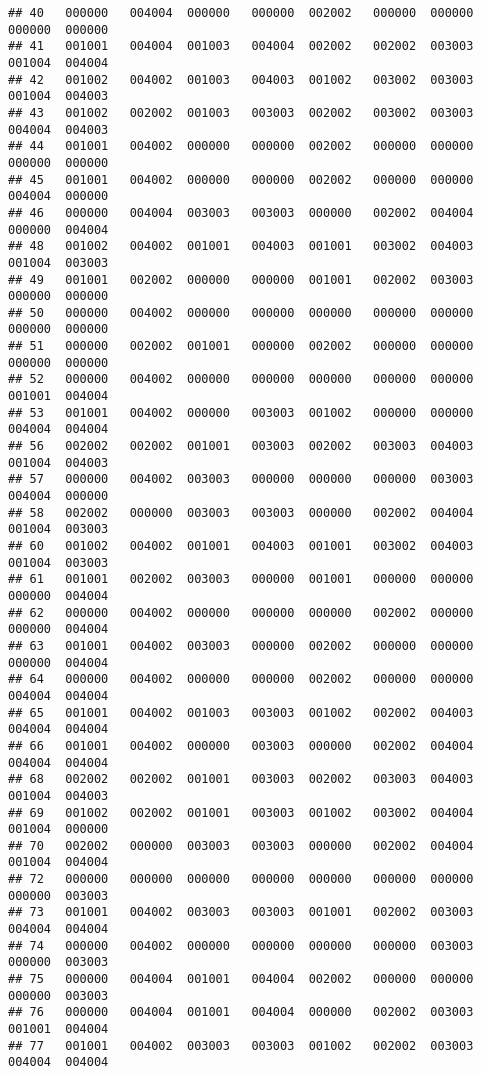 \documentclass[
]{article}
\begin{document}
\begin{verbatim}
## 40   000000   004004  000000   000000  002002   000000  000000   000000  000000
## 41   001001   004004  001003   004004  002002   002002  003003   001004  004004
## 42   001002   004002  001003   004003  001002   003002  003003   001004  004003
## 43   001002   002002  001003   003003  002002   003002  003003   004004  004003
## 44   001001   004002  000000   000000  002002   000000  000000   000000  000000
## 45   001001   004002  000000   000000  002002   000000  000000   004004  000000
## 46   000000   004004  003003   003003  000000   002002  004004   000000  004004
## 48   001002   004002  001001   004003  001001   003002  004003   001004  003003
## 49   001001   002002  000000   000000  001001   002002  003003   000000  000000
## 50   000000   004002  000000   000000  000000   000000  000000   000000  000000
## 51   000000   002002  001001   000000  002002   000000  000000   000000  000000
## 52   000000   004002  000000   000000  000000   000000  000000   001001  004004
## 53   001001   004002  000000   003003  001002   000000  000000   004004  004004
## 56   002002   002002  001001   003003  002002   003003  004003   001004  004003
## 57   000000   004002  003003   000000  000000   000000  003003   004004  000000
## 58   002002   000000  003003   003003  000000   002002  004004   001004  003003
## 60   001002   004002  001001   004003  001001   003002  004003   001004  003003
## 61   001001   002002  003003   000000  001001   000000  000000   000000  004004
## 62   000000   004002  000000   000000  000000   002002  000000   000000  004004
## 63   001001   004002  003003   000000  002002   000000  000000   000000  004004
## 64   000000   004002  000000   000000  002002   000000  000000   004004  004004
## 65   001001   004002  001003   003003  001002   002002  004003   004004  004004
## 66   001001   004002  000000   003003  000000   002002  004004   004004  004004
## 68   002002   002002  001001   003003  002002   003003  004003   001004  004003
## 69   001002   002002  001001   003003  001002   003002  004004   001004  000000
## 70   002002   000000  003003   003003  000000   002002  004004   001004  004004
## 72   000000   000000  000000   000000  000000   000000  000000   000000  003003
## 73   001001   004002  003003   003003  001001   002002  003003   004004  004004
## 74   000000   004002  000000   000000  000000   000000  003003   000000  003003
## 75   000000   004004  001001   004004  002002   000000  000000   000000  003003
## 76   000000   004004  001001   004004  000000   002002  003003   001001  004004
## 77   001001   004002  003003   003003  001002   002002  003003   004004  004004

\end{verbatim}
\end{document}
